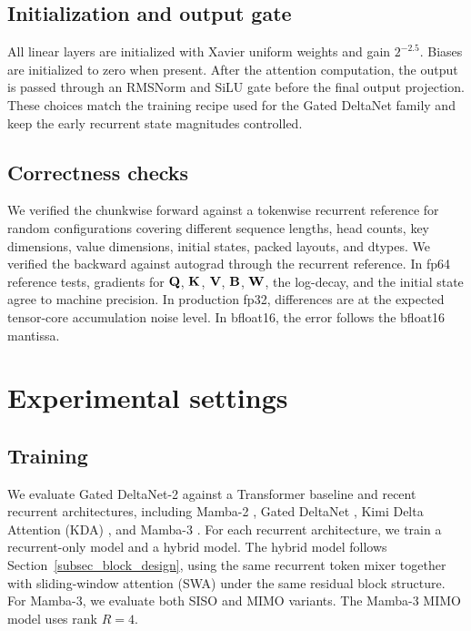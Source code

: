 \subsection{Initialization and output gate}
\label{app_init_output_gate}

All linear layers are initialized with Xavier uniform weights and gain $2^{-2.5}$. Biases are initialized to zero when present. After the attention computation, the output is passed through an RMSNorm and SiLU gate before the final output projection. These choices match the training recipe used for the Gated DeltaNet family and keep the early recurrent state magnitudes controlled.

\subsection{Correctness checks}
\label{app_correctness}

We verified the chunkwise forward against a tokenwise recurrent reference for random configurations covering different sequence lengths, head counts, key dimensions, value dimensions, initial states, packed layouts, and dtypes. We verified the backward against autograd through the recurrent reference. In fp64 reference tests, gradients for ${\mathbf{Q}}$, ${\mathbf{K}}$, ${\mathbf{V}}$, ${\mathbf{B}}$, ${\mathbf{W}}$, the log-decay, and the initial state agree to machine precision. In production fp32, differences are at the expected tensor-core accumulation noise level. In bfloat16, the error follows the bfloat16 mantissa.

\section{Experimental settings}
\label{app_experimental_settings}

\subsection{Training}

We evaluate Gated DeltaNet-2 against a Transformer baseline and recent recurrent architectures, including Mamba-2 \citep{pmlr-v235-dao24a}, Gated DeltaNet \citep{yang2025gated}, Kimi Delta Attention (KDA) \citep{team2025kimi}, and Mamba-3 \citep{lahoti2026mamba3}. For each recurrent architecture, we train a recurrent-only model and a hybrid model. The hybrid model follows Section~\ref{subsec_block_design}, using the same recurrent token mixer together with sliding-window attention (SWA) under the same residual block structure. For Mamba-3, we evaluate both SISO and MIMO variants. The Mamba-3 MIMO model uses rank $R=4$.

